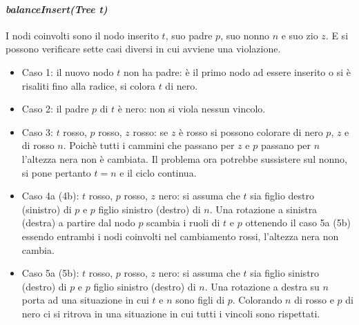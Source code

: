 \paragraph{\emph{balanceInsert(Tree t)}}
I nodi coinvolti sono il nodo inserito $t$, suo padre $p$, suo nonno $n$ e suo zio $z$. E si possono verificare sette casi diversi in cui avviene una
violazione.
\begin{multicols}{2}
\begin{itemize}
\item Caso 1: il nuovo nodo $t$ non ha padre: \`e il primo nodo ad essere inserito o si \`e risaliti fino alla radice, si colora $t$ di nero.
\item Caso 2: il padre $p$ di $t$ \`e nero: non si viola nessun vincolo.
\item Caso 3: $t$ rosso, $p$ rosso, $z$ rosso: se $z$ \`e rosso si possono colorare di nero $p$, $z$ e di rosso $n$. Poich\`e tutti i cammini che passano 
per $z$ e $p$ passano per $n$ l'altezza nera non \`e cambiata. Il problema ora potrebbe sussistere sul nonno, si pone pertanto $t=n$ e il ciclo continua.
\item Caso 4a (4b): $t$ rosso, $p$ rosso, $z$ nero: si assuma che $t$ sia figlio destro (sinistro) di $p$ e $p$ figlio sinistro (destro) di $n$. Una 
rotazione a sinistra (destra) a partire dal nodo $p$ scambia i ruoli di $t$ e $p$ ottenendo il caso 5a (5b) essendo entrambi i nodi coinvolti nel 
cambiamento rossi, l'altezza nera non cambia.
\item Caso 5a (5b): $t$ rosso, $p$ rosso, $z$ nero: si assuma che $t$ sia figlio sinistro (destro) di $p$ e $p$ figlio sinistro (destro) di $n$. Una 
rotazione a destra su $n$ porta ad una situazione in cui $t$ e $n$ sono figli di $p$. Colorando $n$ di rosso e $p$ di nero ci si ritrova in una situazione
in cui tutti i vincoli sono rispettati. 
\end{itemize}
\end{multicols}
